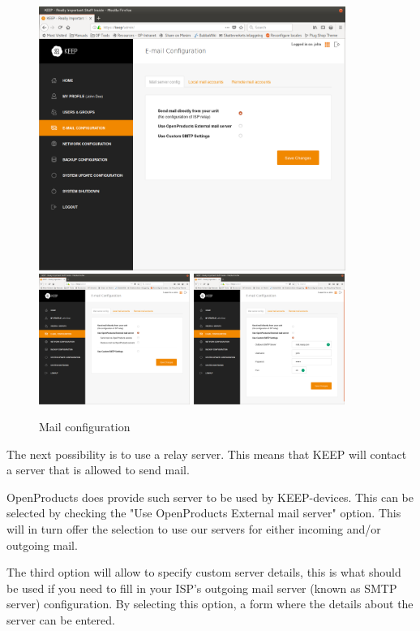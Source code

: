 \documentclass[12pt,a4paper,titlepage]{article}
\begin{document}
\begin{figure}[h!]
\centering
\includegraphics[width=10cm]{./img/smtp_config}
\includegraphics[width=4.93cm]{./img/smtp_config-2}
\includegraphics[width=4.93cm]{./img/smtp_config-3}
\caption{Mail configuration}
\end{figure}
The next possibility is to use a relay server. This means that KEEP will contact a server that is allowed to send mail.

OpenProducts does provide such server to be used by KEEP-devices. This can be selected by checking the "Use OpenProducts External mail server" option. This will in turn offer the selection to use our servers for either incoming and/or outgoing mail.

The third option will allow to specify custom server details, this is what should be used if you need to fill in your ISP's outgoing mail server (known as SMTP server) configuration. By selecting this option, a form where the details about the server can be entered.
\end{document}
